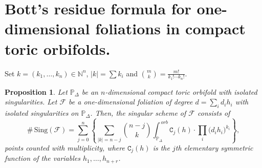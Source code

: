 \documentclass[11pt]{amsart}
\theoremstyle{plain}
\newtheorem{prop}{Proposition}[section]
\theoremstyle{definition}
\begin{document}

\section{Bott's residue formula for one-dimensional foliations in compact toric orbifolds.}

Set $k=(k_1,\ldots,k_n)\in\mathbb{N}^{n}$, $\left|k\right|=\sum k_i$ and $\binom{m}{k}=\frac{m!}{k_1!\cdots k_{n}!}$.

\begin{prop} \label{pro1} Let $\mathbb{P}_{\Delta}$ be an $n$-dimensional compact toric orbifold with isolated singularities.
Let $\mathcal{F}$ be a one-dimensional foliation of degree $d=\sum_{i}d_{i} h_i$
with isolated singularities on $\mathbb{P}_{\Delta}$. Then, the singular scheme of $\mathcal{F}$ consists of
$$\#\,\mathrm{Sing}(\mathcal{F})
=\sum_{j=0}^{n}\left\{\sum_{\left|k\right|=n-j}\binom{n-j}{k} \int_{\mathbb{P}_{\Delta}}^{\,orb} 
\texttt{C}_j(h)\cdot \prod_i \big(d_ih_i\big)^{k_i}\right\},$$ %
points counted with multiplicity, where $\texttt{C}_j(h)$ is the $j$th elementary symmetric function
of the variables $h_1,\ldots,h_{n+r}$.
\end{prop}

\end{document}
